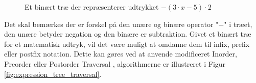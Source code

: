 \begin{figure}[H]
\centering
{}
\caption{Et binært træ der repræsenterer udtrykket $-(3 \cdot x - 5) \cdot 2$}
\label{fig:expression_tree}
\end{figure}
Det skal bemærkes der er forskel på den unære og binære operator "$-$" i træet, den unære betyder negation og den binære er subtraktion. Givet et binært træ for et matematisk udtryk, vil det være muligt at omdanne dem til infix, prefix eller postfix notation. Dette kan gøres ved at anvende modificeret Inorder, Preorder eller Postorder Traversal , algorithmerne er illustreret i Figur \ref{fig:expression_tree_traversal}.


